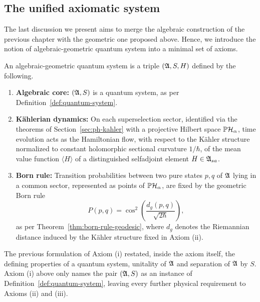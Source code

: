\subsection*{The unified axiomatic system}
The last discussion we present aims to merge the algebraic construction of the previous chapter with the geometric one proposed above. Hence, we introduce the notion of algebraic-geometric quantum system into a minimal set of axioms. 

\begin{definition}
	\label{def:algebraic-geometric-system}
	An algebraic-geometric quantum system is a triple $(\mathfrak{A}, S, H)$ defined by the following.
	\begin{enumerate}
		\item[(i)] \textbf{Algebraic core:} $(\mathfrak{A}, S)$ is a quantum system, as per
		Definition~\ref{def:quantum-system}.
		
		\item[(ii)] \textbf{Kählerian dynamics:} On each superselection sector, identified via the
		theorems of Section~\ref{sec:ph-kahler} with a projective Hilbert space
		$\PH_\alpha$, time evolution acts as the Hamiltonian flow, with respect to the
		Kähler structure normalized to constant holomorphic sectional curvature $1/\hbar$, of the
		mean value function $\langle H \rangle$ of a distinguished selfadjoint element
		$H \in \mathfrak{A}_{sa}$.
		
		\item[(iii)] \textbf{Born rule:} Transition probabilities between two pure states $p, q$ of
		$\mathfrak{A}$ lying in a common sector, represented as points of $\PH_\alpha$, are
		fixed by the geometric Born rule
		\[
		P(p,q) = \cos^2\!\left(\frac{d_g(p,q)}{\sqrt{2\hbar}}\right),
		\]
		as per Theorem~\ref{thm:born-rule-geodesic}, where $d_g$ denotes the Riemannian distance
		induced by the Kähler structure fixed in Axiom (ii).
	\end{enumerate}
\end{definition}

\begin{remark}
	The previous formulation of Axiom (i) restated, inside the axiom itself, the defining
	properties of a quantum system, unitality of $\mathfrak{A}$ and separation of $\mathfrak{A}$
	by $S$. Axiom (i) above only names the pair
	$(\mathfrak{A}, S)$ as an instance of Definition~\ref{def:quantum-system}, leaving every
	further physical requirement to Axioms (ii) and (iii).
\end{remark}

